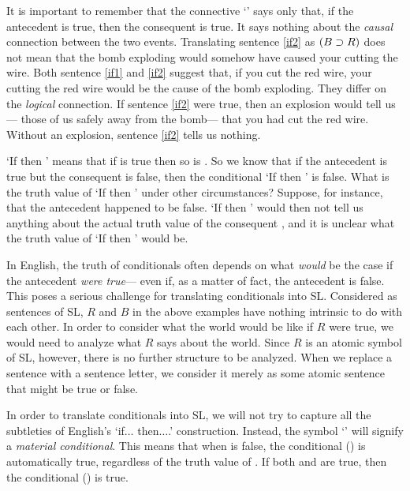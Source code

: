 It is important to remember that the connective `\eif' says only that, if the antecedent is true, then the consequent is true. It says nothing about the \emph{causal} connection between the two events. Translating sentence \ref{if2} as $(B \supset R)$ does not mean that the bomb exploding would somehow have caused your cutting the wire. Both sentence \ref{if1} and \ref{if2} suggest that, if you cut the red wire, your cutting the red wire would be the cause of the bomb exploding. They differ on the \emph{logical} connection. If sentence \ref{if2} were true, then an explosion would tell us--- those of us safely away from the bomb--- that you had cut the red wire. Without an explosion, sentence \ref{if2} tells us nothing.



`If \metaA{} then \metaB{}' means that if \metaA{} is true then so is \metaB{}. So we know that if the antecedent \metaA{} is true but the consequent \metaB{} is false, then the conditional `If \metaA{} then \metaB{}' is false. What is the truth value of `If \metaA{} then \metaB{}' under other circumstances? Suppose, for instance, that the antecedent \metaA{} happened to be false. `If \metaA{} then \metaB{}' would then not tell us anything about the actual truth value of the consequent \metaB{}, and it is unclear what the truth value of `If \metaA{} then \metaB{}' would be.

In English, the truth of conditionals often depends on what \emph{would} be the case if the antecedent \emph{were true}--- even if, as a matter of fact, the antecedent is false. This poses a serious challenge for translating conditionals into SL.  Considered as sentences of SL, $R$ and $B$ in the above examples have nothing intrinsic to do with each other. In order to consider what the world would be like if $R$ were true, we would need to analyze what $R$ says about the world. Since $R$ is an atomic symbol of SL, however, there is no further structure to be analyzed. When we replace a sentence with a sentence letter, we consider it merely as some atomic sentence that might be true or false.

In order to translate conditionals into SL, we will not try to capture all the subtleties of English's `if$\ldots$ then$\ldots$.' construction. Instead, the symbol `\eif' will signify a \emph{material conditional}. This means that when \metaA{} is false, the conditional (\metaA{}\eif\metaB{}) is automatically true, regardless of the truth value of \metaB{}. If both \metaA{} and \metaB{} are true, then the conditional (\metaA{}\eif\metaB{}) is true.


